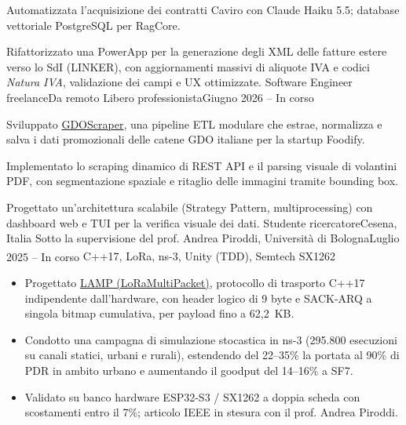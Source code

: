 \documentclass[letterpaper,11pt,italian]{article}
\begin{document}
  \item\small{Automatizzata l'acquisizione dei contratti Caviro con Claude Haiku 5.5; database vettoriale PostgreSQL per RagCore.}
  \item\small{Rifattorizzato una PowerApp per la generazione degli XML delle fatture estere verso lo SdI (LINKER), con aggiornamenti massivi di aliquote IVA e codici \textit{Natura IVA}, validazione dei campi e UX ottimizzate.}
\resumeItemListEnd
\resumeSubheading
{Software Engineer freelance}{Da remoto}
{Libero professionista}{Giugno 2026 -- In corso}
\resumeItemListStart
  \item\small{Sviluppato \href{https://github.com/aleemont1/supermarket-scraper}{GDOScraper}, una pipeline ETL modulare che estrae, normalizza e salva i dati promozionali delle catene GDO italiane per la startup Foodify.}
  \item\small{Implementato lo scraping dinamico di REST API e il parsing visuale di volantini PDF, con segmentazione spaziale e ritaglio delle immagini tramite bounding box.}
  \item\small{Progettato un'architettura scalabile (Strategy Pattern, multiprocessing) con dashboard web e TUI per la verifica visuale dei dati.}
\resumeItemListEnd
\resumeSubheading
{Studente ricercatore}{Cesena, Italia}
{Sotto la supervisione del prof. Andrea Piroddi, Università di Bologna}{Luglio 2025 -- In corso}
\resumeItemListStart
{} {C++17, LoRa\textsuperscript{\textcopyright}, ns-3, Unity (TDD), Semtech SX1262}
{
  \begin{itemize}
    \item Progettato \href{https://github.com/aleemont1/LAMP}{LAMP (LoRaMultiPacket)}, protocollo di trasporto C++17 indipendente dall'hardware, con header logico di 9 byte e SACK-ARQ a singola bitmap cumulativa, per payload fino a 62,2~KB.
    \item Condotto una campagna di simulazione stocastica in ns-3 (295.800 esecuzioni su canali statici, urbani e rurali), estendendo del 22--35\% la portata al 90\% di PDR in ambito urbano e aumentando il goodput del 14--16\% a SF7.
    \item Validato su banco hardware ESP32-S3 / SX1262 a doppia scheda con scostamenti entro il 7\%; articolo IEEE in stesura con il prof. Andrea Piroddi.
  \end{itemize}
}
\resumeItemListEnd
{}
\end{document}
